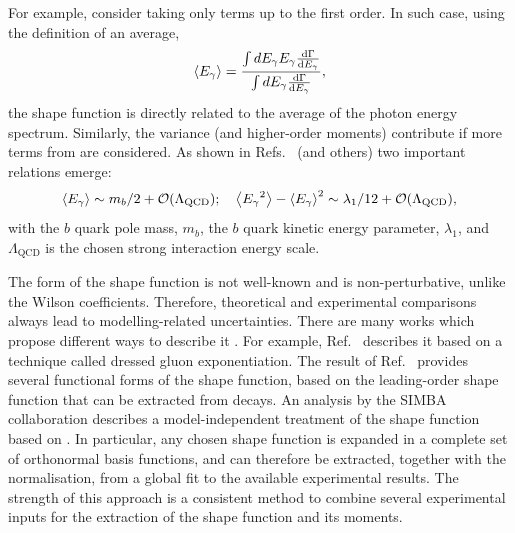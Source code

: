 For example, consider taking only terms up to the first order.
In such case, using the definition of an average,
\begin{equation}
    \expval{{\ensuremath{E_{\gamma}}}} = \frac{\int d{E_{\gamma}} {E_{\gamma}} \dv{\Gamma}{{\ensuremath{E_{\gamma}}}}}{\int d{E_{\gamma}} \dv{\Gamma}{{\ensuremath{E_{\gamma}}}}},
\end{equation}
the shape function is directly related to the average of the photon energy spectrum.
Similarly, the variance (and higher-order moments) contribute if more terms from  are considered.
As shown in Refs.~\cite{Bauer:1997fe,Kapustin:1995fk,Benson:2004sg} (and others) two important relations emerge:
\begin{equation}
    \expval{\Egamma} \sim m_b/2+\order(\Lambda_{\mathrm{QCD}}); \quad \expval{\Egamma^2}-\expval{\Egamma}^2 \sim \lambda_1/12+\order(\Lambda_{\mathrm{QCD}}),
\end{equation}
with the $b$ quark pole mass, $m_b$, the $b$ quark kinetic energy parameter, $\lambda_1$, and $\Lambda_{\mathrm{QCD}}$ is the chosen strong interaction energy scale.

The form of the shape function is not well-known and is non-perturbative, unlike the Wilson coefficients.
Therefore, theoretical and experimental comparisons always lead to modelling-related uncertainties.
There are many works which propose different ways to describe it \cite{Benson:2004sg,Lange:2005yw,Andersen:2005mj,Gambino:2007rp,Aglietti:2007ik,Bernlochner:2020jlt}.
For example, Ref.~\cite{Andersen:2005mj} describes it based on a technique called dressed gluon exponentiation.
The result of Ref.~\cite{Lange:2005yw} provides several functional forms of the shape function, based on the leading-order shape function that can be extracted from \BtoXsgamma decays.
An analysis by the SIMBA collaboration \cite{Bernlochner:2020jlt} describes a model-independent treatment of the shape function based on .
In particular, any chosen shape function is expanded in a complete set of orthonormal basis functions, and can therefore be extracted, together with the normalisation, from a global fit to the available experimental results.
The strength of this approach is a consistent method to combine several experimental inputs for the extraction of the shape function and its moments.

